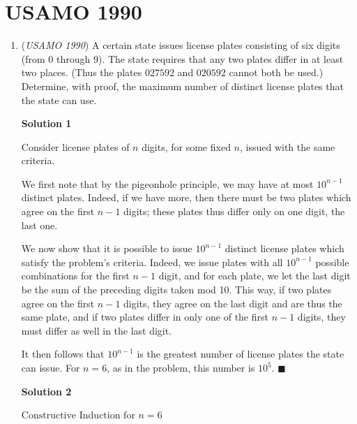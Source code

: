 \section{USAMO 1990}
        \begin{enumerate}
        	\item (\textit{USAMO 1990}) A certain state issues license plates consisting of six digits (from 0 through 9). The state requires that any two plates differ in at least two places. (Thus the plates $\boxed{027592}$ and $\boxed{020592}$ cannot both be used.) Determine, with proof, the maximum number of distinct license plates that the state can use.


 



\textbf{Solution 1}

Consider license plates of $n$ digits, for some fixed $n$, issued with the same criteria.

 We first note that by the pigeonhole principle, we may have at most $10^{n-1}$ distinct plates.  Indeed, if we have more, then there must be two plates which agree on the first $n-1$ digits; these plates thus differ only on one digit, the last one.

 We now show that it is possible to issue $10^{n-1}$ distinct license plates which satisfy the problem's criteria.  Indeed, we issue plates with all $10^{n-1}$ possible combinations for the first $n-1$ digit, and for each plate, we let the last digit be the sum of the preceding digits taken mod 10.  This way, if two plates agree on the first $n-1$ digits, they agree on the last digit and are thus the same plate, and if two plates differ in only one of the first $n-1$ digits, they must differ as well in the last digit.

 It then follows that $10^{n-1}$ is the greatest number of license plates the state can issue.  For $n=6$, as in the problem, this number is $10^5$.  $\blacksquare$




\textbf{Solution 2}

$\text{Constructive Induction for } n=6$
\begin{verbatim}


\end{verbatim}
\end{enumerate}
